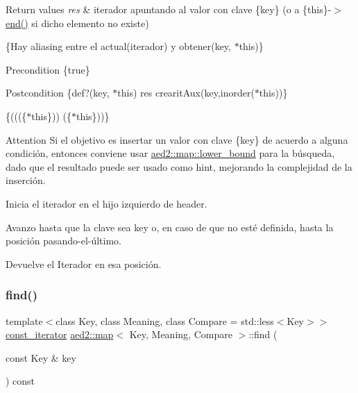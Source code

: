 \begin{DoxyRetVals}{Return values}
{\em res} & iterador apuntando al valor con clave \{key\} (o a \{this\}-\/$>$\hyperlink{classaed2_1_1map_a76023e6a56cb625513e1b5ea028bf983}{end()} si dicho elemento no existe)\\
\hline
\end{DoxyRetVals}
\{Hay aliasing entre el actual(iterador) y obtener(key, $\ast$this)\}

\begin{DoxyPrecond}{Precondition}
\{true\} 
\end{DoxyPrecond}
\begin{DoxyPostcond}{Postcondition}
\{def?(key, $\ast$this)  res  crearit\+Aux(key,inorder($\ast$this))\}
\end{DoxyPostcond}
\{(((\{$\ast$this\}))  (\{$\ast$this\}))\}

\begin{DoxyAttention}{Attention}
Si el objetivo es insertar un valor con clave \{key\} de acuerdo a alguna condición, entonces conviene usar \hyperlink{classaed2_1_1map_a62075a47afdf89267c5462f88164af3d}{aed2\+::map\+::lower\+\_\+bound} para la búsqueda, dado que el resultado puede ser usado como hint, mejorando la complejidad de la inserción.
\begin{DoxyItemize}
\item Inicia el iterador en el hijo izquierdo de header.
\item Avanzo hasta que la clave sea key o, en caso de que no esté definida, hasta la posición pasando-\/el-\/último.
\item Devuelve el Iterador en esa posición. 
\end{DoxyItemize}
\end{DoxyAttention}
\mbox{\label{classaed2_1_1map_adbf6f4ce01a16ca506e3c75fc2843882}} 
\subsubsection{\texorpdfstring{find()}{find()}\hspace{0.1cm}{\footnotesize\ttfamily [3/4]}}
{\footnotesize\ttfamily template$<$class Key, class Meaning, class Compare = std\+::less$<$\+Key$>$$>$ \\
\hyperlink{classaed2_1_1map_1_1const__iterator}{const\+\_\+iterator} \hyperlink{classaed2_1_1map}{aed2\+::map}$<$ Key, Meaning, Compare $>$\+::find (\begin{DoxyParamCaption}\item[{const Key \&}]{key }\end{DoxyParamCaption}) const\hspace{0.3cm}{\ttfamily [inline]}}

